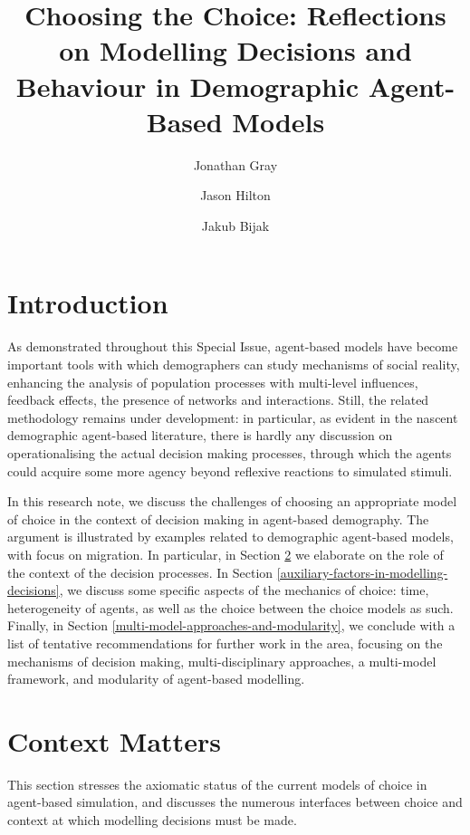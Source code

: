 \documentclass{article}
\begin{document}
\title{Choosing the Choice: Reflections on Modelling Decisions and Behaviour in Demographic Agent-Based Models}
\author{Jonathan Gray \and Jason Hilton \and Jakub Bijak}

\maketitle

\section{Introduction}
\label{sec:intro}

As demonstrated throughout this Special Issue, agent-based models have become important tools with which demographers can study mechanisms of social reality, enhancing the analysis of population processes with multi-level influences, feedback effects, the presence of networks and interactions. Still, the related methodology remains under development: in particular, as evident in the nascent demographic agent-based literature, there is hardly any discussion on operationalising the actual decision making processes, through which the agents could acquire some more agency beyond reflexive reactions to simulated stimuli. 

In this research note, we discuss the challenges of choosing an appropriate model of choice in the context of decision making in agent-based demography. The argument is illustrated by examples related to demographic agent-based models, with focus on migration. In particular, in Section \ref{sec:context_matters} we elaborate on the role of the context of the decision processes. In Section \ref{auxiliary-factors-in-modelling-decisions}, we discuss some specific aspects of the mechanics of choice: time, heterogeneity of agents, as well as the choice between the choice models as such. Finally, in Section \ref{multi-model-approaches-and-modularity}, we conclude with a list of tentative recommendations for further work in the area, focusing on the mechanisms of decision making, multi-disciplinary approaches, a multi-model framework, and modularity of agent-based modelling.


\section{Context Matters}
\label{sec:context_matters}

This section stresses the axiomatic status of the current models of choice in agent-based simulation, and discusses the numerous interfaces between choice and context at which modelling decisions must be made.
\end{document}
